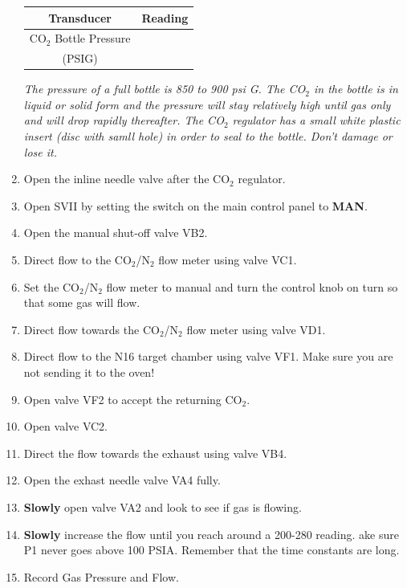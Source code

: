 \documentclass[10pt]{article}
\begin{document}
\begin{enumerate}
\begin{center}
\begin{tabular}{|c|c|}
\hline
Transducer & Reading \\
\hline
CO$_{2}$ Bottle Pressure & \\
(PSIG) & \\
\hline
\end{tabular}
\end{center}
{\it The pressure of a full bottle is 850 to 900 psi G. The CO$_{2}$ in the bottle is in liquid or solid form and the pressure will stay relatively high until gas only and will drop rapidly thereafter. The CO$_{2}$ regulator has a small white plastic insert (disc with samll hole) in order to seal to the bottle. Don't damage or lose it.}
\item \CheckBox[name=gbsp13]{} Open the inline needle valve after the CO$_2$ regulator.
\item \CheckBox[name=gbsp14]{} Open SVII by setting the switch on the main control panel to {\bf MAN}.
\item \CheckBox[name=gbsp15]{} Open the manual shut-off valve VB2.
\item \CheckBox[name=gbsp16]{} Direct flow to the CO$_2$/N$_2$ flow meter using valve VC1.
\item \CheckBox[name=gbsp17]{} Set the CO$_2$/N$_2$ flow meter to manual and turn the control knob on turn so that some gas will flow.
\item \CheckBox[name=gbsp18]{} Direct flow towards the CO$_2$/N$_2$ flow meter using valve VD1.
\item \CheckBox[name=gbsp19]{} Direct flow to the N16 target chamber using valve VF1. Make sure you are not sending it to the oven!
\item \CheckBox[name=gbsp20]{} Open valve VF2 to accept the returning CO$_2$.
\item \CheckBox[name=gbsp21]{} Open valve VC2.
\item \CheckBox[name=gbsp22]{} Direct the flow towards the exhaust using valve VB4.
\item \CheckBox[name=gbsp23]{} Open the exhast needle valve VA4 fully.
\item \CheckBox[name=gbsp24]{} {\bf Slowly} open valve VA2 and look to see if gas is flowing.
\item \CheckBox[name=gbsp25]{} {\bf Slowly} increase the flow until you reach around a 200-280 reading. ake sure P1 never goes above 100 PSIA. Remember that the time constants are long.
\item \CheckBox[name=gbsp26]{} Record Gas Pressure and Flow.

\end{enumerate}
\end{document}
